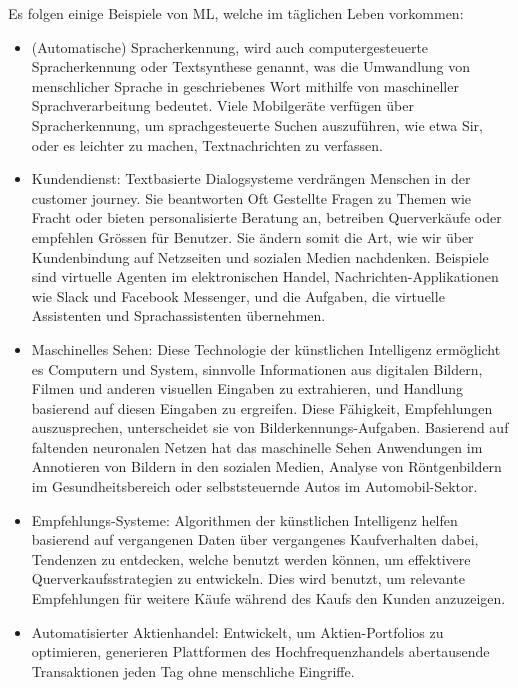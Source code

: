 \begin{lpu}
\begin{artikelbox}
Es folgen einige Beispiele von ML, welche im täglichen Leben vorkommen: 
\begin{itemize}
\item (Automatische) Spracherkennung, wird auch computergesteuerte Spracherkennung oder Textsynthese genannt, was die Umwandlung von menschlicher Sprache in geschriebenes Wort mithilfe von maschineller Sprachverarbeitung bedeutet. Viele Mobilgeräte verfügen über Spracherkennung, um sprachgesteuerte Suchen auszuführen, wie etwa Sir, oder es leichter zu machen, Textnachrichten zu verfassen.
\item Kundendienst: Textbasierte Dialogsysteme verdrängen Menschen in der customer journey. Sie beantworten Oft Gestellte Fragen zu Themen wie Fracht oder bieten personalisierte Beratung an, betreiben Querverkäufe oder empfehlen Grössen für Benutzer. Sie ändern somit die Art, wie wir über Kundenbindung auf Netzseiten und sozialen Medien nachdenken. Beispiele sind virtuelle Agenten im elektronischen Handel, Nachrichten-Applikationen wie Slack und Facebook Messenger, und die Aufgaben, die virtuelle Assistenten und Sprachassistenten übernehmen.
\item Maschinelles Sehen: Diese Technologie der künstlichen Intelligenz ermöglicht es Computern und System, sinnvolle Informationen aus digitalen Bildern, Filmen und anderen visuellen Eingaben zu extrahieren, und Handlung basierend auf diesen Eingaben zu ergreifen. Diese Fähigkeit, Empfehlungen auszusprechen, unterscheidet sie von Bilderkennungs-Aufgaben. Basierend auf faltenden neuronalen Netzen hat das maschinelle Sehen Anwendungen im Annotieren von Bildern in den sozialen Medien, Analyse von Röntgenbildern im Gesundheitsbereich oder selbststeuernde Autos im Automobil-Sektor.
\item Empfehlungs-Systeme: Algorithmen der künstlichen Intelligenz helfen basierend auf vergangenen Daten über vergangenes Kaufverhalten dabei, Tendenzen zu entdecken, welche benutzt werden können, um effektivere Querverkaufsstrategien zu entwickeln. Dies wird benutzt, um relevante Empfehlungen für weitere Käufe während des Kaufs den Kunden anzuzeigen.
\item Automatisierter Aktienhandel: Entwickelt, um Aktien-Portfolios zu optimieren, generieren Plattformen des Hochfrequenzhandels abertausende Transaktionen jeden Tag ohne menschliche Eingriffe.
\end{itemize}
\end{artikelbox}


\end{lpu}
